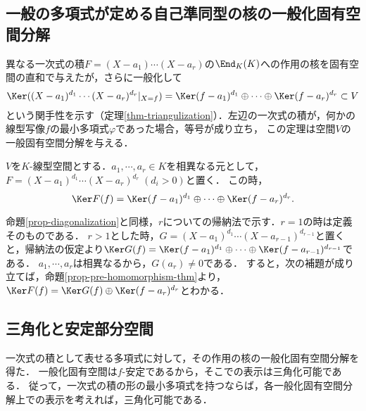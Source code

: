 \documentclass[uplatex, dvipdfmx]{jsreport}
\begin{document}
\subsection{一般の多項式が定める自己準同型の核の一般化固有空間分解}

\begin{tcolorbox}[colframe=ForestGreen, colback=ForestGreen!10!white, breakable]
    異なる一次式の積$F=(X-a_1)\cdots(X-a_r)$の$\End_K(K)$への作用の核を固有空間の直和で与えたが，さらに一般化して
    \[\Ker((X-a_1)^{d_1}\cdots(X-a_r)^{d_r}|_{X=f})=\Ker(f-a_1)^{d_1}\oplus\cdots\oplus\Ker(f-a_r)^{d_r}\subset V\]
    という関手性を示す（定理\ref{thm-triangulization}）．左辺の一次式の積が，何かの線型写像$f$の最小多項式$\varphi$であった場合，等号が成り立ち，
    この定理は空間$V$の一般固有空間分解を与える．
\end{tcolorbox}

\begin{theorem}[一般の多項式が定める自己準同型の核]\label{thm-triangulization}
    $V$を$K$-線型空間とする．$a_1,\cdots,a_r\in K$を相異なる元として，$F=(X-a_1)^{d_1}\cdots(X-a_r)^{d_r}\;(d_i>0)$と置く．
    この時，
    \[ \Ker F(f)=\Ker(f-a_1)^{d_1}\oplus\cdots\oplus\Ker(f-a_r)^{d_r}. \]
\end{theorem}
\begin{Proof}
    命題\ref{prop-diagonalization}と同様，$r$についての帰納法で示す．$r=1$の時は定義そのものである．
    $r>1$とした時，$G=(X-a_1)^{d_1}\cdots(X-a_{r-1})^{d_{r-1}}$と置くと，帰納法の仮定より$\Ker G(f)=\Ker(f-a_1)^{d_1}\oplus\cdots\oplus\Ker(f-a_{r-1})^{d_{r-1}}$である．
    $a_1,\cdots,a_r$は相異なるから，$G(a_r)\ne 0$である．
    すると，次の補題が成り立てば，命題\ref{prop-pre-homomorphism-thm}より，$\Ker F(f)=\Ker G(f)\oplus\Ker(f-a_r)^{d_r}$とわかる．
\end{Proof}

\subsection{三角化と安定部分空間}

\begin{tcolorbox}[colframe=ForestGreen, colback=ForestGreen!10!white,breakable,colbacktitle=ForestGreen!40!white,coltitle=black,fonttitle=\bfseries\sffamily,
title=上三角化をSchur標準形ともいう，一意性はないが]
    一次式の積として表せる多項式に対して，その作用の核の一般化固有空間分解を得た．
    一般化固有空間は$f$-安定であるから，そこでの表示は三角化可能である．
    従って，一次式の積の形の最小多項式を持つならば，各一般化固有空間分解上での表示を考えれば，三角化可能である．
\end{tcolorbox}
\end{document}

